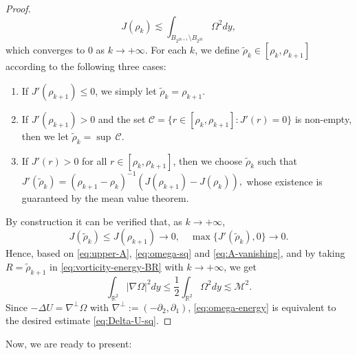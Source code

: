 \documentclass[12pt,reqno]{amsart}
\theoremstyle{plain}
\theoremstyle{definition}
\newcommand{\R}{\mathbb{R}}
\newcommand{\M}{\mathcal{M}}
\renewcommand{\:}{\colon}
\numberwithin{equation}{section}
\numberwithin{figure}{section}
\begin{document}
\begin{proof}
	\begin{equation}
		J(\rho_k) \lesssim \int_{B_{2^{2k+1}} \setminus B_{2^{2k}}} \Omega^2 dy,
	\end{equation}
	which converges to $0$ as $k \to +\infty$. For each $k$, we define $\widetilde{\rho}_k \in [\rho_k, \rho_{k+1}]$ according to the following three cases:
	\begin{enumerate}
		\item If $J'(\rho_{k+1}) \le 0$, we simply let $\widetilde{\rho}_k =\rho_{k+1}$.
		\item If $J'(\rho_{k+1}) > 0$ and the set $\mathcal{C} = \{r \in [\rho_k, \rho_{k+1}] : J'(r)=0\}$ is non-empty, then we let $\widetilde{\rho}_k = \sup \, \mathcal{C}$.
		\item If $J'(r) > 0$ for all $r \in [\rho_k, \rho_{k+1}]$, then we choose $\widetilde{\rho}_{k}$ such that $J'(\widetilde{\rho}_{k}) = (\rho_{k+1} - \rho_k)^{-1}(J(\rho_{k+1})-J(\rho_k)),$
		whose existence is guaranteed by the mean value theorem. 
	\end{enumerate}
	By construction it can be verified that, as $k \to +\infty$,
	\begin{equation} \label{eq:A-vanishing}
		J(\widetilde{\rho}_k) \le J(\rho_{k+1}) \to 0, \quad  \max \{J'(\widetilde{\rho}_k), 0\} \to 0.
	\end{equation}
	Hence, based on \eqref{eq:upper-A}, \eqref{eq:omega-sq} and \eqref{eq:A-vanishing}, and by taking $R = \widetilde{\rho}_{k+1}$ in \eqref{eq:vorticity-energy-BR} with $k \to +\infty$, we get
	\begin{equation} \label{eq:omega-energy}
		\int_{\R^2} |\nabla \Omega|^2 dy \le \frac12 \int_{\R^2} \Omega^2 dy  \lesssim \M^2.
	\end{equation}
	Since $-\Delta U = \nabla^\perp \Omega$ with $\nabla^\perp := (-\partial_2, \partial_1)$, \eqref{eq:omega-energy} is equivalent to the desired estimate \eqref{eq:Delta-U-sq}.
	
\end{proof}


Now, we are ready to present:
\end{document}
